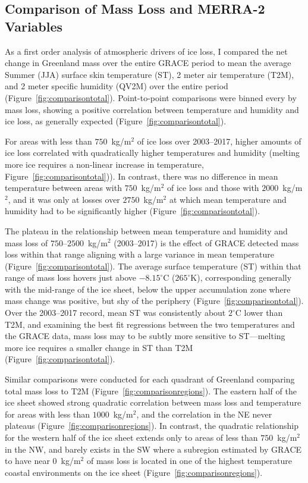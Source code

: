\documentclass[11pt]{report}
\begin{document}
\clearpage
\subsection{Comparison of Mass Loss and MERRA-2 Variables}		

As a first order analysis of atmospheric drivers of ice loss, I compared the net change in Greenland mass over the entire GRACE period to mean the average Summer (JJA) surface skin temperature (ST), 2 meter air temperature (T2M), and 2 meter specific humidity (QV2M) over the entire period (Figure~\ref{fig:comparisontotal}). Point-to-point comparisons were binned every by mass loss, showing a positive correlation between temperature and humidity and ice loss, as generally expected (Figure~\ref{fig:comparisontotal}). 

For areas with less than $750$~kg/m$^2$ of ice loss over 2003--2017, higher amounts of ice loss correlated with quadratically higher temperatures and humidity (melting more ice requires a non-linear increase in temperature, Figure~\ref{fig:comparisontotal})). In contrast, there was no difference in mean temperature between areas with $750$~kg/m$^2$ of ice loss and those with $2000$~kg/m$^2$, and it was only at losses over $2750$~kg/m$^2$ at which mean temperature and humidity had to be significantly higher (Figure~\ref{fig:comparisontotal}). 

The plateau in the relationship between mean temperature and humidity and mass loss of $750$--$2500$~kg/m$^2$ (2003--2017) is the effect of GRACE detected mass loss within that range aligning with a large variance in mean temperature (Figure~\ref{fig:comparisontotal}). The average surface temperature (ST) within that range of mass loss hovers just above $-8.15^{\circ}$C ($265^{\circ}$K), corresponding generally with the mid-range of the ice sheet, below the upper accumulation zone where mass change was positive, but shy of the periphery (Figure~\ref{fig:comparisontotal}). Over the 2003--2017 record, mean ST was consistently about $2^{\circ}$C lower than T2M, and examining the best fit regressions between the two temperatures and the GRACE data, mass loss may to be subtly more sensitive to ST---melting more ice requires a smaller change in ST than T2M (Figure~\ref{fig:comparisontotal}).

Similar comparisons were conducted for each quadrant of Greenland comparing total mass loss to T2M (Figure~\ref{fig:comparisonregions}). The eastern half of the ice sheet showed strong quadratic correlation between mass loss and temperature for areas with less than $1000$~kg/m$^2$, and the correlation in the NE never plateaus (Figure~\ref{fig:comparisonregions}). In contrast, the quadratic relationship for the western half of the ice sheet extends only to areas of less than $750$~kg/m$^2$ in the NW, and barely exists in the SW where a subregion estimated by GRACE to have near $0$~kg/m$^2$ of mass loss is located in one of the highest temperature coastal environments on the ice sheet (Figure~\ref{fig:comparisonregions}). 
\end{document}
